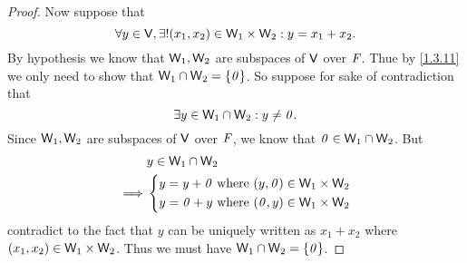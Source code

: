 \begin{proof}
  Now suppose that
  \[
    \forall y \in \mathsf{V}, \exists! (x_1, x_2) \in \mathsf{W}_1 \times \mathsf{W}_2 : y = x_1 + x_2.
  \]
  By hypothesis we know that \(\mathsf{W}_1, \mathsf{W}_2\) are subspaces of \(\mathsf{V}\) over \(\mathit{F}\).
  Thue by \cref{1.3.11} we only need to show that \(\mathsf{W}_1 \cap \mathsf{W}_2 = \left\lbrace\mathit{0}\right\rbrace\).
  So suppose for sake of contradiction that
  \[
    \exists y \in \mathsf{W}_1 \cap \mathsf{W}_2 : y \neq \mathit{0}.
  \]
  Since \(\mathsf{W}_1, \mathsf{W}_2\) are subspaces of \(\mathsf{V}\) over \(\mathit{F}\), we know that \(\mathit{0} \in \mathsf{W}_1 \cap \mathsf{W}_2\).
  But
  \begin{align*}
             & y \in \mathsf{W}_1 \cap \mathsf{W}_2        \\
    \implies & \begin{dcases}
      y = y + \mathit{0} \text{ where } (y, \mathit{0}) \in \mathsf{W}_1 \times \mathsf{W}_2 \\
      y = \mathit{0} + y \text{ where } (\mathit{0}, y) \in \mathsf{W}_1 \times \mathsf{W}_2
    \end{dcases}
  \end{align*}
  contradict to the fact that \(y\) can be uniquely written as \(x_1 + x_2\) where \((x_1, x_2) \in \mathsf{W}_1 \times \mathsf{W}_2\).
  Thus we must have \(\mathsf{W}_1 \cap \mathsf{W}_2 = \left\lbrace\mathit{0}\right\rbrace\).
\end{proof}